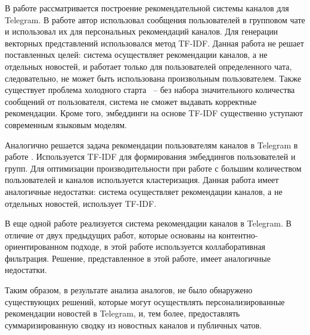 В работе \cite{tg_rs_1} рассматривается построение рекомендательной системы каналов для Telegram. В работе автор использовал сообщения пользователей в групповом чате и использовал их для персональных рекомендаций каналов. Для генерации векторных представлений использовался метод TF-IDF. Данная работа не решает поставленных целей: система осуществляет рекомендации каналов, а не отдельных новостей, и работает только для пользователей определенного чата, следовательно, не может быть использована произвольным пользователем. Также существует проблема холодного старта ~-- без набора значительного количества сообщений от пользователя, система не сможет выдавать корректные рекомендации. Кроме того, эмбеддинги на основе TF-IDF существенно уступают современным языковым моделям.

Аналогично решается задача рекомендации пользователям каналов в Telegram в работе \cite{tg_rs_2}. Используется TF-IDF для формирования эмбеддингов пользователей и групп. Для оптимизации производительности при работе с большим количеством пользователей и каналов используется кластеризация. Данная работа имеет аналогичные недостатки: система осуществляет рекомендации каналов, а не отдельных новостей, использует TF-IDF.

В еще одной работе \cite{tg_rs_3} реализуется система рекомендации каналов в Telegram. В отличие от двух предыдущих работ, которые основаны на контентно-ориентированном подходе, в этой работе используется коллаборативная фильтрация. Решение, представленное в этой работе, имеет аналогичные недостатки.

Таким образом, в результате анализа аналогов, не было обнаружено существующих решений, которые могут осуществлять персонализированные рекомендации новостей в Telegram, и, тем более, предоставлять суммаризированную сводку из новостных каналов и публичных чатов.
